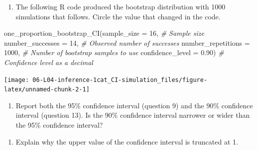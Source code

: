 \documentclass[
]{report}
\newenvironment{Shaded}{\begin{snugshade}}{\end{snugshade}}
\newcommand{\AttributeTok}[1]{\textcolor[rgb]{0.77,0.63,0.00}{#1}}
\newcommand{\CommentTok}[1]{\textcolor[rgb]{0.56,0.35,0.01}{\textit{#1}}}
\newcommand{\DecValTok}[1]{\textcolor[rgb]{0.00,0.00,0.81}{#1}}
\newcommand{\FloatTok}[1]{\textcolor[rgb]{0.00,0.00,0.81}{#1}}
\newcommand{\FunctionTok}[1]{\textcolor[rgb]{0.00,0.00,0.00}{#1}}
\newcommand{\NormalTok}[1]{#1}
\providecommand{\tightlist}{%
  \setlength{\itemsep}{0pt}\setlength{\parskip}{0pt}}
\begin{document}
\begin{enumerate}
\def\labelenumi{\arabic{enumi}.}
\setcounter{enumi}{12}
\tightlist
\item
  The following R code produced the bootstrap distribution with 1000 simulations that follows. Circle the value that changed in the code.
\end{enumerate}

\begin{Shaded}
\begin{Highlighting}[]
\FunctionTok{one\_proportion\_bootstrap\_CI}\NormalTok{(}\AttributeTok{sample\_size =} \DecValTok{16}\NormalTok{, }\CommentTok{\# Sample size}
                    \AttributeTok{number\_successes =} \DecValTok{14}\NormalTok{, }\CommentTok{\# Observed number of successes}
                    \AttributeTok{number\_repetitions =} \DecValTok{1000}\NormalTok{, }\CommentTok{\# Number of bootstrap samples to use}
                    \AttributeTok{confidence\_level =} \FloatTok{0.90}\NormalTok{) }\CommentTok{\# Confidence level as a decimal}
\end{Highlighting}
\end{Shaded}

\begin{center}\texttt{[image: 06-L04-inference-1cat\_CI-simulation\_files/figure-latex/unnamed-chunk-2-1]} \end{center}

\begin{enumerate}
\def\labelenumi{\arabic{enumi}.}
\setcounter{enumi}{13}
\tightlist
\item
  Report both the 95\% confidence interval (question 9) and the 90\% confidence interval (question 13). Is the 90\% confidence interval narrower or wider than the 95\% confidence interval?
\end{enumerate}

\vspace{0.5in}

\begin{enumerate}
\def\labelenumi{\arabic{enumi}.}
\setcounter{enumi}{14}
\tightlist
\item
  Explain why the upper value of the confidence interval is truncated at 1.
\end{enumerate}

\vspace{0.5in}

\newpage

\end{document}
